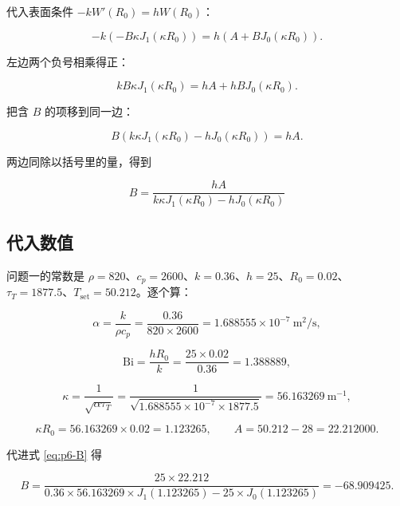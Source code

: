 代入表面条件 $-kW'(R_0)=hW(R_0)$：

\begin{equation}
-k\left(-B\kappa J_1(\kappa R_0)\right)=h\left(A+B J_0(\kappa R_0)\right).
\end{equation}

左边两个负号相乘得正：

\begin{equation}
kB\kappa J_1(\kappa R_0)=hA+hB J_0(\kappa R_0).
\end{equation}

把含 $B$ 的项移到同一边：

\begin{equation}
B\left(k\kappa J_1(\kappa R_0)-h J_0(\kappa R_0)\right)=hA .
\end{equation}

两边同除以括号里的量，得到

\begin{equation}
\boxed{\ B=\frac{hA}{k\kappa J_1(\kappa R_0)-h J_0(\kappa R_0)}\ }
\label{eq:p6-B}
\end{equation}

\subsection{代入数值}

问题一的常数是 $\rho=820$、$c_p=2600$、$k=0.36$、$h=25$、$R_0=0.02$、
$\tau_T=1877.5$、$T_{\mathrm{set}}=50.212$。逐个算：

\begin{equation}
\alpha=\frac{k}{\rho c_p}=\frac{0.36}{820\times2600}=1.688555\times10^{-7}\ \mathrm{m^2/s},
\end{equation}

\begin{equation}
\mathrm{Bi}=\frac{hR_0}{k}=\frac{25\times0.02}{0.36}=1.388889,
\end{equation}

\begin{equation}
\kappa=\frac{1}{\sqrt{\alpha\tau_T}}
=\frac{1}{\sqrt{1.688555\times10^{-7}\times1877.5}}=56.163269\ \mathrm{m^{-1}},
\end{equation}

\begin{equation}
\kappa R_0=56.163269\times0.02=1.123265,
\qquad
A=50.212-28=22.212000 .
\end{equation}

代进式 \eqref{eq:p6-B} 得

\begin{equation}
B=\frac{25\times22.212}{0.36\times56.163269\times J_1(1.123265)-25\times J_0(1.123265)}
=-68.909425 .
\end{equation}

